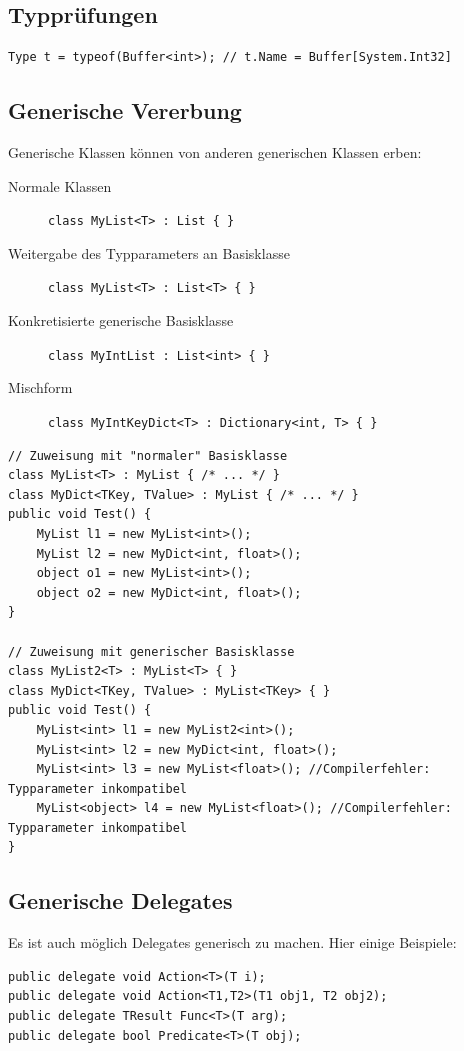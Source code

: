 \documentclass[
a4paper,
oneside,
10pt,
fleqn,
headsepline,
toc=listofnumbered, 
bibliography=totocnumbered]{scrartcl}
\begin{document}
\subsection{Typprüfungen}
\begin{lstlisting}
Type t = typeof(Buffer<int>); // t.Name = Buffer[System.Int32]
\end{lstlisting}

\subsection{Generische Vererbung}
Generische Klassen können von anderen generischen Klassen erben:
\begin{description}
	\item[Normale Klassen] \lstinline|class MyList<T> : List { } |
	\item[Weitergabe des Typparameters an Basisklasse] \lstinline|class MyList<T> : List<T> { } |
	\item [Konkretisierte generische Basisklasse] \lstinline|class MyIntList : List<int> { } |
	\item[Mischform] \lstinline|class MyIntKeyDict<T> : Dictionary<int, T> { } |
\end{description}
\begin{lstlisting}
// Zuweisung mit "normaler" Basisklasse
class MyList<T> : MyList { /* ... */ } 
class MyDict<TKey, TValue> : MyList { /* ... */ } 
public void Test() {
    MyList l1 = new MyList<int>();
    MyList l2 = new MyDict<int, float>();
    object o1 = new MyList<int>();
    object o2 = new MyDict<int, float>(); 
} 

// Zuweisung mit generischer Basisklasse
class MyList2<T> : MyList<T> { } 
class MyDict<TKey, TValue> : MyList<TKey> { }
public void Test() { 
    MyList<int> l1 = new MyList2<int>();
    MyList<int> l2 = new MyDict<int, float>();
    MyList<int> l3 = new MyList<float>(); //Compilerfehler: Typparameter inkompatibel
    MyList<object> l4 = new MyList<float>(); //Compilerfehler: Typparameter inkompatibel
}
\end{lstlisting}
\subsection{Generische Delegates}
Es ist auch möglich Delegates generisch zu machen. Hier einige Beispiele:
\begin{lstlisting}
public delegate void Action<T>(T i); 
public delegate void Action<T1,T2>(T1 obj1, T2 obj2); 
public delegate TResult Func<T>(T arg); 
public delegate bool Predicate<T>(T obj); 
\end{lstlisting}
\end{document}
